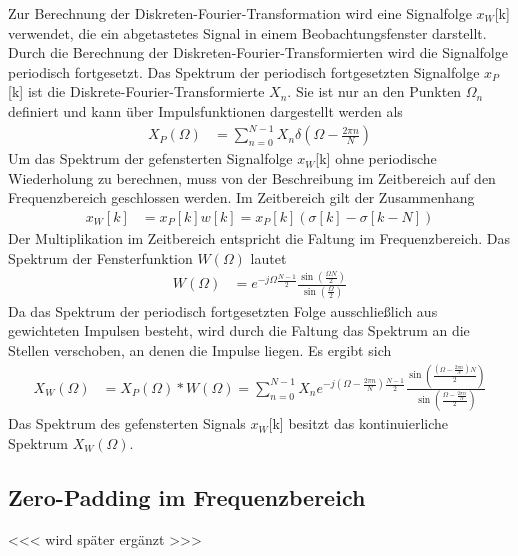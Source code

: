 Zur Berechnung der Diskreten-Fourier-Transformation wird eine Signalfolge \(x_{W}\){[}k{]} verwendet, die ein abgetastetes Signal in einem Beobachtungsfenster darstellt. Durch die Berechnung der Diskreten-Fourier-Transformierten wird die Signalfolge periodisch fortgesetzt. Das Spektrum der periodisch fortgesetzten Signalfolge \(x_{P}\){[}k{]} ist die Diskrete-Fourier-Transformierte \(X_{n}\). Sie ist nur an den Punkten \(Ω_{n}\) definiert und kann über Impulsfunktionen dargestellt werden als
\begin{align}
X_{P}(\Omega) &= \sum\limits_{n = 0}^{N - 1}{X_{n}  \delta\left( \Omega - \frac{2  \pi  n}{N} \right)} \label{eq:10.77}
\end{align}
Um das Spektrum der gefensterten Signalfolge \(x_{W}\){[}k{]} ohne periodische Wiederholung zu berechnen, muss von der Beschreibung im Zeitbereich auf den Frequenzbereich geschlossen werden. Im Zeitbereich gilt der Zusammenhang
\begin{align}
x_{W}[ k] &= x_{P}[ k]  w[ k] = x_{P}[ k]  \left( \sigma[ k] - \sigma[ k - N] \right) \label{eq:10.78}
\end{align}
Der Multiplikation im Zeitbereich entspricht die Faltung im Frequenzbereich. Das Spektrum der Fensterfunktion \(W(Ω)\) lautet
\begin{align}
W(\Omega) &= e^{- j  \Omega  \frac{N - 1}{2}}  \frac{\sin\left( \frac{\Omega  N}{2} \right)}{\sin\left( \frac{\Omega}{2} \right)} \label{eq:10.79}
\end{align}
Da das Spektrum der periodisch fortgesetzten Folge ausschließlich aus gewichteten Impulsen besteht, wird durch die Faltung das Spektrum an die Stellen verschoben, an denen die Impulse liegen. Es ergibt sich
\begin{align}
X_{W}(\Omega) &= X_{P}(\Omega)*W(\Omega) = \sum\limits_{n = 0}^{N - 1}{X_{n}  e^{- j  \left( \Omega - \frac{2  \pi  n}{N} \right)  \frac{N - 1}{2}}  \frac{\sin\left( \frac{\left( \Omega - \frac{2  \pi  n}{N} \right)  N}{2} \right)}{\sin\left( \frac{\Omega - \frac{2  \pi  n}{N}}{2} \right)}} \label{eq:10.80}
\end{align}
Das Spektrum des gefensterten Signals \(x_{W}\){[}k{]} besitzt das kontinuierliche Spektrum \(X_{W}(Ω)\).

\subsection{Zero-Padding im Frequenzbereich}\label{sec:zero-padding-im-frequenzbereich}

\textless\textless\textless{} wird später ergänzt \textgreater\textgreater\textgreater{}


